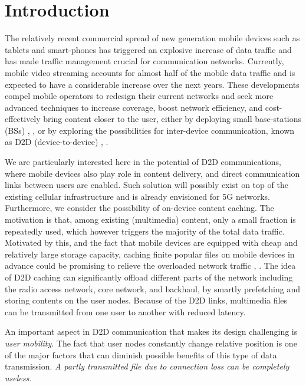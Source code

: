 \documentclass[conference]{IEEEtran}
\begin{document}
\section{Introduction}
The relatively recent commercial spread of new generation mobile devices such as tablets and smart-phones has triggered an explosive increase of data traffic and has made traffic management crucial for communication networks. Currently, mobile video streaming accounts for almost half of the mobile data traffic and is expected to have a considerable increase over the next years. These developments compel mobile operators to redesign their current networks and seek more advanced techniques to increase coverage, boost network efficiency, and cost-effectively bring content closer to the user, either by deploying small base-stations (BSs) \cite{golrezaei2013femtocaching}, \cite{bastug2014living}, or by exploring the possibilities for inter-device communication, known as D2D (device-to-device)  \cite{golrezaei2013femtocaching}, \cite{ADhill15b}.

We are particularly interested here in the potential of D2D communications, where mobile devices also play role in content delivery, and direct communication links between users are enabled. Such solution will possibly exist on top of the existing cellular infrastructure and is already envisioned for 5G networks. Furthermore, we consider the possibility of on-device content caching. The motivation is that, among existing (multimedia) content, only a small fraction is repeatedly used, which however triggers the majority of the total data traffic. Motivated by this, and the fact that mobile devices are equipped with cheap and relatively large storage capacity, caching finite popular files on mobile devices in advance could be promising to relieve the overloaded network traffic \cite{molisch2014caching}, \cite{ji2013fundamental}. The idea of D2D caching can significantly offload different parts of the network including the radio access network, core network, and backhaul, by smartly prefetching and storing contents on the user nodes. Because of the D2D links, multimedia files can be transmitted from one user to another with reduced latency. 

An important aspect in D2D communication that makes its design challenging is \textit{user mobility}. The fact that user nodes constantly change relative position is one of the major factors that can diminish possible benefits of this type of data transmission. \textit{A partly transmitted file due to connection loss can be completely useless}. 
\end{document}
